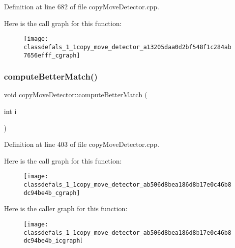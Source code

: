 Definition at line 682 of file copy\+Move\+Detector.\+cpp.

Here is the call graph for this function\+:\nopagebreak
\begin{figure}[H]
\begin{center}
\leavevmode
\texttt{[image: classdefals\_1\_1copy\_move\_detector\_a13205daa0d2bf548f1c284ab7656efff\_cgraph]}
\end{center}
\end{figure}
\mbox{\label{classdefals_1_1copy_move_detector_ab506d8bea186d8b17e0c46b8dc94be4b}} 
\subsubsection{\texorpdfstring{compute\+Better\+Match()}{computeBetterMatch()}}
{\footnotesize\ttfamily void copy\+Move\+Detector\+::compute\+Better\+Match (\begin{DoxyParamCaption}\item[{int}]{i }\end{DoxyParamCaption})\hspace{0.3cm}{\ttfamily [private]}}



Definition at line 403 of file copy\+Move\+Detector.\+cpp.

Here is the call graph for this function\+:\nopagebreak
\begin{figure}[H]
\begin{center}
\leavevmode
\texttt{[image: classdefals\_1\_1copy\_move\_detector\_ab506d8bea186d8b17e0c46b8dc94be4b\_cgraph]}
\end{center}
\end{figure}
Here is the caller graph for this function\+:\nopagebreak
\begin{figure}[H]
\begin{center}
\leavevmode
\texttt{[image: classdefals\_1\_1copy\_move\_detector\_ab506d8bea186d8b17e0c46b8dc94be4b\_icgraph]}
\end{center}
\end{figure}
\mbox{\label{classdefals_1_1copy_move_detector_ada9b809bd69be7dc9a6535b1c07967b7}} 
